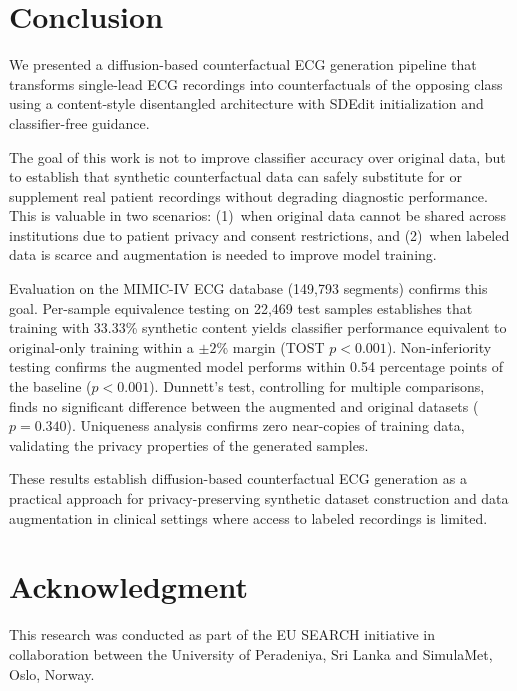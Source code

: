 \documentclass[conference]{IEEEtran}
\begin{document}
\section{Conclusion}

We presented a diffusion-based counterfactual ECG generation pipeline that transforms single-lead ECG recordings into counterfactuals of the opposing class using a content-style disentangled architecture with SDEdit initialization and classifier-free guidance.

The goal of this work is not to improve classifier accuracy over original data, but to establish that synthetic counterfactual data can safely substitute for or supplement real patient recordings without degrading diagnostic performance. This is valuable in two scenarios: (1)~when original data cannot be shared across institutions due to patient privacy and consent restrictions, and (2)~when labeled data is scarce and augmentation is needed to improve model training.

Evaluation on the MIMIC-IV ECG database (149,793 segments) confirms this goal. Per-sample equivalence testing on 22,469 test samples establishes that training with 33.33\% synthetic content yields classifier performance equivalent to original-only training within a $\pm 2\%$ margin (TOST $p{<}0.001$). Non-inferiority testing confirms the augmented model performs within 0.54 percentage points of the baseline ($p{<}0.001$). Dunnett's test, controlling for multiple comparisons, finds no significant difference between the augmented and original datasets ($p{=}0.340$). Uniqueness analysis confirms zero near-copies of training data, validating the privacy properties of the generated samples.

These results establish diffusion-based counterfactual ECG generation as a practical approach for privacy-preserving synthetic dataset construction and data augmentation in clinical settings where access to labeled recordings is limited.

\section*{Acknowledgment}
This research was conducted as part of the EU SEARCH initiative in collaboration between the University of Peradeniya, Sri Lanka and SimulaMet, Oslo, Norway.
\end{document}
